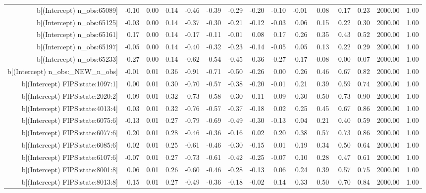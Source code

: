 \begin{table}[ht]
\begin{tabular}{rrrrrrrrrrrrrrr}
  b[(Intercept) n\_obs:65089] & -0.10 & 0.00 & 0.14 & -0.46 & -0.39 & -0.29 & -0.20 & -0.10 & -0.01 & 0.08 & 0.17 & 0.23 & 2000.00 & 1.00 \\ 
  b[(Intercept) n\_obs:65125] & -0.03 & 0.00 & 0.14 & -0.37 & -0.30 & -0.21 & -0.12 & -0.03 & 0.06 & 0.15 & 0.22 & 0.30 & 2000.00 & 1.00 \\ 
  b[(Intercept) n\_obs:65161] & 0.17 & 0.00 & 0.14 & -0.17 & -0.11 & -0.01 & 0.08 & 0.17 & 0.26 & 0.35 & 0.43 & 0.52 & 2000.00 & 1.00 \\ 
  b[(Intercept) n\_obs:65197] & -0.05 & 0.00 & 0.14 & -0.40 & -0.32 & -0.23 & -0.14 & -0.05 & 0.05 & 0.13 & 0.22 & 0.29 & 2000.00 & 1.00 \\ 
  b[(Intercept) n\_obs:65233] & -0.27 & 0.00 & 0.14 & -0.62 & -0.54 & -0.45 & -0.36 & -0.27 & -0.17 & -0.08 & -0.00 & 0.07 & 2000.00 & 1.00 \\ 
  b[(Intercept) n\_obs:\_NEW\_n\_obs] & -0.01 & 0.01 & 0.36 & -0.91 & -0.71 & -0.50 & -0.26 & 0.00 & 0.26 & 0.46 & 0.67 & 0.82 & 2000.00 & 1.00 \\ 
  b[(Intercept) FIPS:state:1097:1] & 0.00 & 0.01 & 0.30 & -0.70 & -0.57 & -0.38 & -0.20 & -0.01 & 0.21 & 0.39 & 0.59 & 0.74 & 2000.00 & 1.00 \\ 
  b[(Intercept) FIPS:state:2020:2] & 0.09 & 0.01 & 0.32 & -0.73 & -0.58 & -0.30 & -0.11 & 0.09 & 0.30 & 0.50 & 0.73 & 0.90 & 2000.00 & 1.00 \\ 
  b[(Intercept) FIPS:state:4013:4] & 0.03 & 0.01 & 0.32 & -0.76 & -0.57 & -0.37 & -0.18 & 0.02 & 0.25 & 0.45 & 0.67 & 0.86 & 2000.00 & 1.00 \\ 
  b[(Intercept) FIPS:state:6075:6] & -0.13 & 0.01 & 0.27 & -0.79 & -0.69 & -0.49 & -0.30 & -0.13 & 0.04 & 0.21 & 0.40 & 0.59 & 2000.00 & 1.00 \\ 
  b[(Intercept) FIPS:state:6077:6] & 0.20 & 0.01 & 0.28 & -0.46 & -0.36 & -0.16 & 0.02 & 0.20 & 0.38 & 0.57 & 0.73 & 0.86 & 2000.00 & 1.00 \\ 
  b[(Intercept) FIPS:state:6085:6] & 0.02 & 0.01 & 0.25 & -0.61 & -0.46 & -0.30 & -0.15 & 0.01 & 0.19 & 0.34 & 0.50 & 0.64 & 2000.00 & 1.00 \\ 
  b[(Intercept) FIPS:state:6107:6] & -0.07 & 0.01 & 0.27 & -0.73 & -0.61 & -0.42 & -0.25 & -0.07 & 0.10 & 0.28 & 0.47 & 0.61 & 2000.00 & 1.00 \\ 
  b[(Intercept) FIPS:state:8001:8] & 0.06 & 0.01 & 0.26 & -0.60 & -0.46 & -0.28 & -0.13 & 0.06 & 0.24 & 0.39 & 0.57 & 0.75 & 2000.00 & 1.00 \\ 
  b[(Intercept) FIPS:state:8013:8] & 0.15 & 0.01 & 0.27 & -0.49 & -0.36 & -0.18 & -0.02 & 0.14 & 0.33 & 0.50 & 0.70 & 0.84 & 2000.00 & 1.00 \\ 

\end{tabular}
\end{table}

